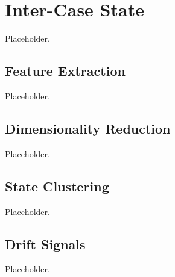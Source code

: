 \chapter{Inter-Case State}
\label{chap:inter_case}

Placeholder.

\section{Feature Extraction}
\label{sec:inter_case:feature_extraction}
Placeholder.

\section{Dimensionality Reduction}
\label{sec:inter_case:reduction}
Placeholder.

\section{State Clustering}
\label{sec:inter_case:state_clustering}
Placeholder.

\section{Drift Signals}
\label{sec:inter_case:drift_signals}
Placeholder.

